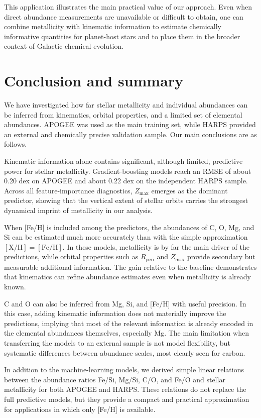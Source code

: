 \documentclass{aa}
\begin{document}
This application illustrates the main practical value of our approach. Even when direct abundance measurements are unavailable or difficult to obtain, one can combine metallicity with kinematic information to estimate chemically informative quantities for planet-host stars and to place them in the broader context of Galactic chemical evolution.

\section{Conclusion and summary}

We have investigated how far stellar metallicity and individual abundances can be inferred from kinematics, orbital properties, and a limited set of elemental abundances. APOGEE was used as the main training set, while HARPS provided an external and chemically precise validation sample. Our main conclusions are as follows.

Kinematic information alone contains significant, although limited, predictive power for stellar metallicity. Gradient-boosting models reach an RMSE of about 0.20 dex on APOGEE and about 0.22 dex on the independent HARPS sample. Across all feature-importance diagnostics, $Z_{\max}$ emerges as the dominant predictor, showing that the vertical extent of stellar orbits carries the strongest dynamical imprint of metallicity in our analysis.

When [Fe/H] is included among the predictors, the abundances of C, O, Mg, and Si can be estimated much more accurately than with the simple approximation $\mathrm{[X/H]}=\mathrm{[Fe/H]}$. In these models, metallicity is by far the main driver of the predictions, while orbital properties such as $R_{\mathrm{peri}}$ and $Z_{\max}$ provide secondary but measurable additional information. The gain relative to the baseline demonstrates that kinematics can refine abundance estimates even when metallicity is already known.

C and O can also be inferred from Mg, Si, and [Fe/H] with useful precision. In this case, adding kinematic information does not materially improve the predictions, implying that most of the relevant information is already encoded in the elemental abundances themselves, especially Mg. The main limitation when transferring the models to an external sample is not model flexibility, but systematic differences between abundance scales, most clearly seen for carbon.

In addition to the machine-learning models, we derived simple linear relations between the abundance ratios Fe/Si, Mg/Si, C/O, and Fe/O and stellar metallicity for both APOGEE and HARPS. These relations do not replace the full predictive models, but they provide a compact and practical approximation for applications in which only [Fe/H] is available.
\end{document}
